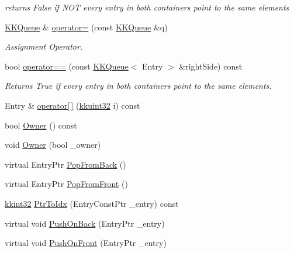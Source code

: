 \begin{DoxyCompactItemize}
\begin{DoxyCompactList}\small\item\em returns False if N\+OT every entry in both containers point to the same elements \end{DoxyCompactList}\item 
\hyperlink{class_k_k_b_1_1_k_k_queue}{K\+K\+Queue} \& \hyperlink{class_k_k_b_1_1_k_k_queue_ac1e30c66658adfcd502af08d177af7da}{operator=} (const \hyperlink{class_k_k_b_1_1_k_k_queue}{K\+K\+Queue} \&q)
\begin{DoxyCompactList}\small\item\em Assignment Operator. \end{DoxyCompactList}\item 
bool \hyperlink{class_k_k_b_1_1_k_k_queue_a93ba7b2058bef5c355f003fe3bdbcab6}{operator==} (const \hyperlink{class_k_k_b_1_1_k_k_queue}{K\+K\+Queue}$<$ Entry $>$ \&right\+Side) const 
\begin{DoxyCompactList}\small\item\em Returns True if every entry in both containers point to the same elements. \end{DoxyCompactList}\item 
Entry \& \hyperlink{class_k_k_b_1_1_k_k_queue_a8c2edf92ac57e26fe47032ad4d92f165}{operator\mbox{[}$\,$\mbox{]}} (\hyperlink{namespace_k_k_b_af8d832f05c54994a1cce25bd5743e19a}{kkuint32} i) const 
\item 
bool \hyperlink{class_k_k_b_1_1_k_k_queue_a4990d037ff09dd504cc7df53819bf61a}{Owner} () const 
\item 
void \hyperlink{class_k_k_b_1_1_k_k_queue_aaf47f5cb6057e35b9f0d230b8b9a3906}{Owner} (bool \+\_\+owner)
\item 
virtual Entry\+Ptr \hyperlink{class_k_k_b_1_1_k_k_queue_a03844c19a838fed7e7bcc5816846dcfd}{Pop\+From\+Back} ()
\item 
virtual Entry\+Ptr \hyperlink{class_k_k_b_1_1_k_k_queue_a2b2205f34516ac1f2950f441625d3ec7}{Pop\+From\+Front} ()
\item 
\hyperlink{namespace_k_k_b_a8fa4952cc84fda1de4bec1fbdd8d5b1b}{kkint32} \hyperlink{class_k_k_b_1_1_k_k_queue_ac7c26abdf599669a4b0898534f735f99}{Ptr\+To\+Idx} (Entry\+Const\+Ptr \+\_\+entry) const 
\item 
virtual void \hyperlink{class_k_k_b_1_1_k_k_queue_aa9fba4632b54268bf71ecb42dee0b575}{Push\+On\+Back} (Entry\+Ptr \+\_\+entry)
\item 
virtual void \hyperlink{class_k_k_b_1_1_k_k_queue_a07b83a99241a167f7a395a40d32f6380}{Push\+On\+Front} (Entry\+Ptr \+\_\+entry)

\end{DoxyCompactItemize}
